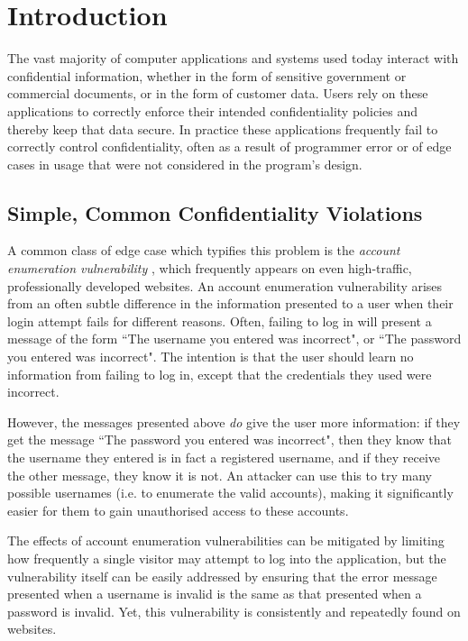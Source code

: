 \chapter{Introduction}

The vast majority of computer applications and systems used today interact with confidential information, whether in the form of sensitive government or commercial documents, or in the form of customer data. Users rely on these applications to correctly enforce their intended confidentiality policies and thereby keep that data secure. In practice these applications frequently fail to correctly control confidentiality, often as a result of programmer error or of edge cases in usage that were not considered in the program's design.

\newpage

\section{Simple, Common Confidentiality Violations}

A common class of edge case which typifies this problem is the \textit{account enumeration vulnerability} \cite{accountenumeration}, which frequently appears on even high-traffic, professionally developed websites. An account enumeration vulnerability arises from an often subtle difference in the information presented to a user when their login attempt fails for different reasons. Often, failing to log in will present a message of the form ``The username you entered was incorrect", or ``The password you entered was incorrect". The intention is that the user should learn no information from failing to log in, except that the credentials they used were incorrect.

However, the messages presented above \textit{do} give the user more information: if they get the message ``The password you entered was incorrect", then they know that the username they entered is in fact a registered username, and if they receive the other message, they know it is not. An attacker can use this to try many possible usernames (i.e. to enumerate the valid accounts), making it significantly easier for them to gain unauthorised access to these accounts.

The effects of account enumeration vulnerabilities can be mitigated by limiting how frequently a single visitor may attempt to log into the application, but the vulnerability itself can be easily addressed by ensuring that the error message presented when a username is invalid is the same as that presented when a password is invalid. Yet, this vulnerability is consistently and repeatedly found on websites.

